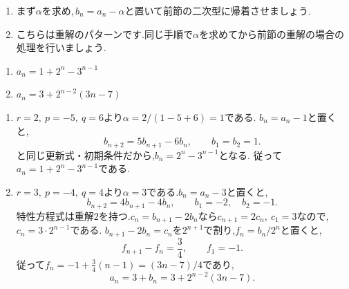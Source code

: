    \noindent{}\par\nobreak
    \begin{enumerate}[label=(\arabic*),parsep=3pt,format=\bookitemlink{example-three-term-2}{hint}{problem}]
      \item まず$\alpha$を求め,\,$b_n=a_n-\alpha$と置いて前節の二次型に帰着させましょう.
      \item こちらは重解のパターンです.同じ手順で$\alpha$を求めてから前節の重解の場合の処理を行いましょう.
    \end{enumerate}

    \noindent{}\par\nobreak
    \begin{enumerate}[label=(\arabic*),parsep=3pt,format=\bookitemlink{example-three-term-2}{answer}{problem}]
      \item $\displaystyle a_n=1+2^n-3^{n-1}$
      \item $\displaystyle a_n=3+2^{n-2}(3n-7)$
    \end{enumerate}

    \noindent{}\par\nobreak
    \begin{enumerate}[label=(\arabic*),parsep=3pt,format=\bookitemlink{example-three-term-2}{solution}{problem}]
      \item $r=2,\ p=-5,\ q=6$より$\alpha=2/(1-5+6)=1$である.
            $b_n=a_n-1$と置くと,
            \[
              b_{n+2}=5b_{n+1}-6b_n,\qquad b_1=b_2=1.
            \]
            と同じ更新式・初期条件だから,$b_n=2^n-3^{n-1}$となる.
            従って$a_n=1+2^n-3^{n-1}$である.
      \item $r=3,\ p=-4,\ q=4$より$\alpha=3$である.$b_n=a_n-3$と置くと,
            \[
              b_{n+2}=4b_{n+1}-4b_n,\qquad b_1=-2,\quad b_2=-1.
            \]
            特性方程式は重解$2$を持つ.$c_n=b_{n+1}-2b_n$なら$c_{n+1}=2c_n,\ c_1=3$なので,$c_n=3\cdot2^{n-1}$である.
            $b_{n+1}-2b_n=c_n$を$2^{n+1}$で割り,$f_n=b_n/2^n$と置くと,
            \[
              f_{n+1}-f_n=\frac34,\qquad f_1=-1.
            \]
            従って$f_n=-1+\frac34(n-1)=(3n-7)/4$であり,
            \[
              a_n=3+b_n=3+2^{n-2}(3n-7).
            \]
    \end{enumerate}


